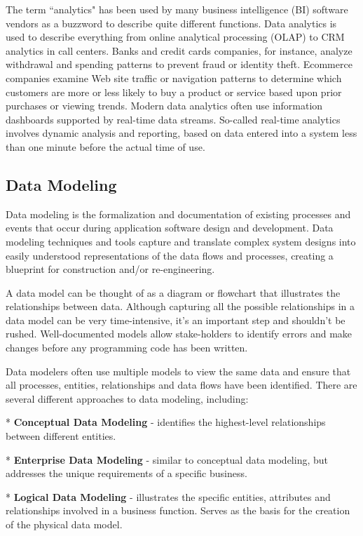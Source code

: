 \begin{description}
The term ``analytics" has been used by many business intelligence (BI) software vendors as a buzzword to describe quite different functions. Data analytics is used to describe everything from online analytical processing (OLAP) to CRM analytics in call centers. Banks and credit cards companies, for instance, analyze withdrawal and spending patterns to prevent fraud or identity theft. Ecommerce companies examine Web site traffic or navigation patterns to determine which customers are more or less likely to buy a product or service based upon prior purchases or viewing trends. Modern data analytics often use information dashboards supported by real-time data streams. So-called real-time analytics involves dynamic analysis and reporting, based on data entered into a system less than one minute before the actual time of use.

  \subsection*{Data Modeling }
Data modeling is the formalization and documentation of existing processes and events that occur during application software design and development. Data modeling techniques and tools capture and translate complex system designs into easily understood representations of the data flows and processes, creating a blueprint for construction and/or re-engineering.

A data model can be thought of as a diagram or flowchart that illustrates the relationships between data. Although capturing all the possible relationships in a data model can be very time-intensive, it's an important step and shouldn't be rushed. Well-documented models allow stake-holders to identify errors and make changes before any programming code has been written.

Data modelers often use multiple models to view the same data and ensure that all processes, entities, relationships and data flows have been identified. There are several different approaches to data modeling, including:

*   \textbf{Conceptual Data Modeling} - identifies the highest-level relationships between different entities.

*   \textbf{Enterprise Data Modeling} - similar to conceptual data modeling, but addresses the unique requirements of a specific business. 

*   \textbf{Logical Data Modeling} - illustrates the specific entities, attributes and relationships involved in a business function. Serves as the basis for the creation of the physical data model.


\end{description}
